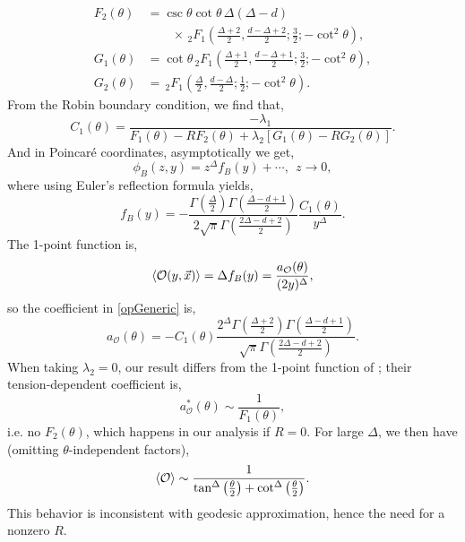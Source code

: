 \documentclass[reprint,amsmath,amssymb,aps,nofootinbib,twocolumn]{revtex4-2}
\begin{document}
\begin{appendix}
\begin{align}
F_2(\theta)
&= \csc\theta\cot\theta\,\Delta(\Delta - d)\nonumber\\
&\qquad\times\,\!_2F_1\left(\frac{\Delta + 2}{2}, \frac{d-\Delta + 2}{2};\frac{3}{2};-\cot^2\theta\right),\\
G_1(\theta)
&= \cot\theta\,_2F_1\left(\frac{\Delta + 1}{2},\frac{d-\Delta + 1}{2};\frac{3}{2};-\cot^2\theta\right),\\
G_2(\theta)
&=\,_2F_1\left(\frac{\Delta}{2},\frac{d-\Delta}{2};\frac{1}{2};-\cot^2\theta\right).
\end{align}
From the Robin boundary condition, we find that,
\begin{equation}
C_1(\theta) = \frac{-\lambda_1}{F_1(\theta) - RF_2(\theta) + \lambda_2[G_1(\theta) - RG_2(\theta)]}.
\end{equation}
And in Poincar\'e coordinates, asymptotically we get,
\begin{equation}
\phi_B(z,y) = z^\Delta f_B(y) + \cdots,\ \ z \to 0,
\end{equation}
where using Euler's reflection formula yields,
\begin{equation}
f_B(y) = -\frac{\Gamma\left(\frac{\Delta}{2}\right)\Gamma\left(\frac{\Delta - d + 1}{2}\right)}{2\sqrt{\pi}\Gamma\left(\frac{2\Delta - d + 2}{2}\right)}\frac{C_1(\theta)}{y^\Delta}.
\end{equation}
The 1-point function is,
\begin{equation}
\expval{\mathcal{O}(y,\vec{x})} = \Delta f_B(y) = \frac{a_\mathcal{O}(\theta)}{(2y)^\Delta},\label{normAns}
\end{equation}
so the coefficient in \eqref{opGeneric} is,
\begin{equation}
a_\mathcal{O}(\theta) = -C_1(\theta)\frac{2^\Delta \Gamma\left(\frac{\Delta+2}{2}\right)\Gamma\left(\frac{\Delta - d + 1}{2}\right)}{\sqrt{\pi}\Gamma\left(\frac{2\Delta - d + 2}{2}\right)}.\label{exactCoeff}
\end{equation}
When taking $\lambda_2 = 0$, our result differs from the 1-point function of \cite{Fujita:2011fp}; their tension-dependent coefficient is,
\begin{equation}
a_\mathcal{O}^*(\theta) \sim \frac{1}{F_1(\theta)},
\end{equation}
i.e. no $F_2(\theta)$, which happens in our analysis if $R = 0$. For large $\Delta$, we then have (omitting $\theta$-independent factors),
\begin{equation}
\expval{\mathcal{O}} \sim \frac{1}{\tan^{\Delta}\left(\frac{\theta}{2}\right) + \cot^\Delta\left(\frac{\theta}{2}\right)}.
\end{equation}
This behavior is inconsistent with geodesic approximation, hence the need for a nonzero $R$.


\end{appendix}
\end{document}
